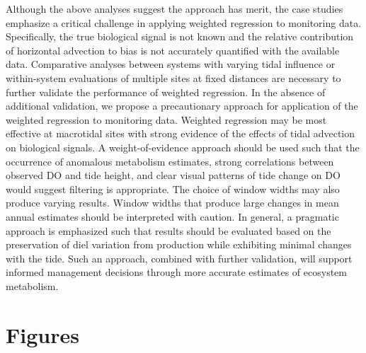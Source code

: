 \documentclass[letterpaper,12pt,oneside]{article}\usepackage[]{graphicx}\usepackage[]{color}
\begin{document}
Although the above analyses suggest the approach has merit, the case studies emphasize a critical challenge in applying weighted regression to monitoring data. Specifically, the true biological signal is not known and the relative contribution of horizontal advection to bias is not accurately quantified with the available data.  Comparative analyses between systems with varying tidal influence or within-system evaluations of multiple sites at fixed distances are necessary to further validate the performance of weighted regression.  In the absence of additional validation, we propose a precautionary approach for application of the weighted regression to monitoring data.  Weighted regression may be most effective at macrotidal sites with strong evidence of the effects of tidal advection on biological signals.  A weight-of-evidence approach should be used such that the occurrence of anomalous metabolism estimates, strong correlations between observed \ac{DO} and tide height, and clear visual patterns of tide change on \ac{DO} would suggest filtering is appropriate.  The choice of window widths may also produce varying results.  Window widths that produce large changes in mean annual estimates should be interpreted with caution.  In general, a pragmatic approach is emphasized such that results should be evaluated based on the preservation of diel variation from production while exhibiting minimal changes with the tide.  Such an approach, combined with further validation, will support informed management decisions through more accurate estimates of ecosystem metabolism.  

\clearpage
\begin{singlespace}


\end{singlespace}
\clearpage


\section{Figures}
\end{document}
